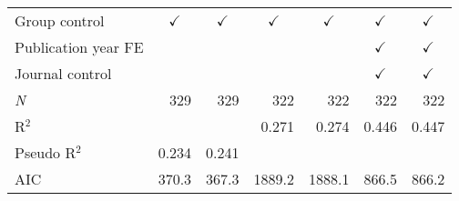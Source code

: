 {\begin{tabular}{l*{6}{D{.}{.}{-1}}}
\addlinespace
Group control       	&         	&         	&         	&         	&         	&         \\
\addlinespace
Publication year FE 	&                        	&                        	&                        	&                        	&         	&         \\
\addlinespace
Journal control     	&                        	&                        	&                        	&                        	&         	&         \\
\midrule
\textit{N}          	&            329         	&            329         	&            322         	&            322         	&            322         	&            322         \\
R$^{2}$             	&                        	&                        	&          0.271         	&          0.274         	&          0.446         	&          0.447         \\
Pseudo R$^{2}$      	&          0.234         	&          0.241         	&                        	&                        	&                        	&                        \\
AIC                 	&          370.3         	&          367.3         	&         1889.2         	&         1888.1         	&          866.5         	&          866.2         \\
\bottomrule
\end{tabular}
}
